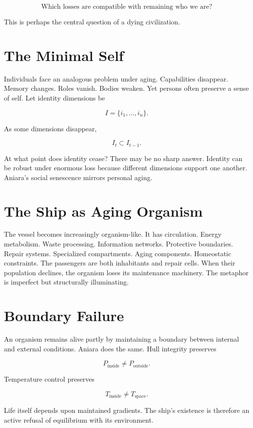 \documentclass[11pt,oneside]{book}
\theoremstyle{definition}
\theoremstyle{remark}
\begin{document}
\[
\text{Which losses are compatible with remaining who we are?}
\]

This is perhaps the central question of a dying civilization.

\section{The Minimal Self}

Individuals face an analogous problem under aging. Capabilities disappear. Memory changes. Roles
vanish. Bodies weaken. Yet persons often preserve a sense of self. Let identity dimensions be

\[
I=\{i_1,\ldots,i_n\}.
\]

As some dimensions disappear,

\[
I_t\subset I_{t-1}.
\]

At what point does identity cease? There may be no sharp answer. Identity can be robust under
enormous loss because different dimensions support one another. Aniara's social senescence mirrors
personal aging.

\section{The Ship as Aging Organism}

The vessel becomes increasingly organism-like. It has circulation. Energy metabolism. Waste
processing. Information networks. Protective boundaries. Repair systems. Specialized compartments.
Aging components. Homeostatic constraints. The passengers are both inhabitants and repair cells.
When their population declines, the organism loses its maintenance machinery. The metaphor is
imperfect but structurally illuminating.

\section{Boundary Failure}

An organism remains alive partly by maintaining a boundary between internal and external conditions.
Aniara does the same. Hull integrity preserves

\[
P_{\mathrm{inside}} \neq P_{\mathrm{outside}}.
\]

Temperature control preserves

\[
T_{\mathrm{inside}} \neq T_{\mathrm{space}}.
\]

Life itself depends upon maintained gradients. The ship's existence is therefore an active refusal
of equilibrium with its environment.
\end{document}
